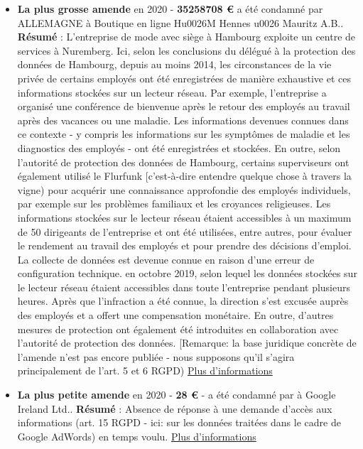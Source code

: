 \documentclass[french]{article}
\begin{document}
\newpage
\justify
	\begin{multicols}{2}
		\begin{itemize}
			\item \textbf{La plus grosse amende} en 2020 - \textbf{35258708 €} a été condamné par ALLEMAGNE à Boutique en ligne Hu0026M Hennes u0026 Mauritz A.B..
			\newline
			\textbf{Résumé} : L'entreprise de mode avec siège à Hambourg exploite un centre de services à Nuremberg. Ici, selon les conclusions du délégué à la protection des données de Hambourg, depuis au moins 2014, les circonstances de la vie privée de certains employés ont été enregistrées de manière exhaustive et ces informations stockées sur un lecteur réseau. Par exemple, l'entreprise a organisé une conférence de bienvenue après le retour des employés au travail après des vacances ou une maladie. Les informations devenues connues dans ce contexte - y compris les informations sur les symptômes de maladie et les diagnostics des employés - ont été enregistrées et stockées. En outre, selon l'autorité de protection des données de Hambourg, certains superviseurs ont également utilisé le Flurfunk [c'est-à-dire entendre quelque chose à travers la vigne) pour acquérir une connaissance approfondie des employés individuels, par exemple sur les problèmes familiaux et les croyances religieuses. Les informations stockées sur le lecteur réseau étaient accessibles à un maximum de 50 dirigeants de l'entreprise et ont été utilisées, entre autres, pour évaluer le rendement au travail des employés et pour prendre des décisions d'emploi. La collecte de données est devenue connue en raison d'une erreur de configuration technique. en octobre 2019, selon lequel les données stockées sur le lecteur réseau étaient accessibles dans toute l'entreprise pendant plusieurs heures. Après que l'infraction a été connue, la direction s'est excusée auprès des employés et a offert une compensation monétaire. En outre, d'autres mesures de protection ont également été introduites en collaboration avec l'autorité de protection des données. [Remarque: la base juridique concrète de l'amende n'est pas encore publiée - nous supposons qu'il s'agira principalement de l'art. 5 et 6 RGPD)
			\newline
			\href{https://datenschutz-hamburg.de/pressemitteilungen/2020/10/2020-10-01-h-m-verfahren}{Plus d'informations}
			\vspace{1cm}
		
			\item \textbf{La plus petite amende} en 2020 - \textbf{28 €} -  a été condamné par  à Google Ireland Ltd..
			\newline
			\textbf{Résumé} : Absence de réponse à une demande d'accès aux informations (art. 15 RGPD - ici: sur les données traitées dans le cadre de Google AdWords) en temps voulu.
			\newline
			\href{https://www.naih.hu/files/NAIH-2020-5553-hatarozat.pdf}{Plus d'informations}
		\end{itemize}
	\end{multicols}
\end{document}
